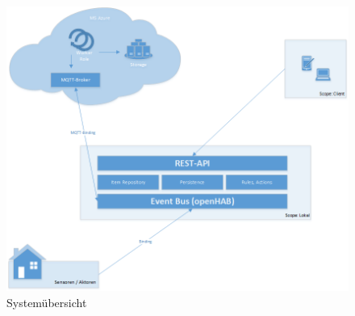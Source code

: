 \begin{figure}[h!]
	\centering
		\includegraphics[scale=0.55]{report/img/systemuebersicht}
	\caption{Systemübersicht}
	\label{fig:systemView}
\end{figure}

\pagebreak